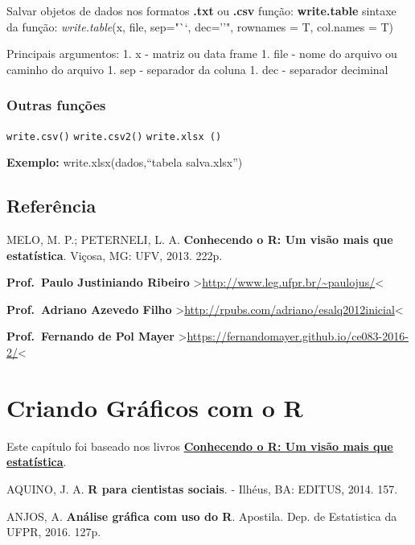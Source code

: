 \documentclass[
]{book}
\begin{document}
Salvar objetos de dados nos formatos \textbf{.txt} ou \textbf{.csv}
função: \textbf{write.table}
sintaxe da função:
\emph{write.table}(x, file, sep="``, dec=''", rownames = T, col.names = T)

Principais argumentos:
1. x - matriz ou data frame
1. file - nome do arquivo ou caminho do arquivo
1. sep - separador da coluna
1. dec - separador deciminal

\hypertarget{outras-funuxe7uxf5es}{%
\subsection{Outras funções}\label{outras-funuxe7uxf5es}}

\texttt{write.csv()}
\texttt{write.csv2()}
\texttt{write.xlsx\ ()}

\textbf{Exemplo:}
write.xlsx(dados,``tabela salva.xlsx'')

\hypertarget{referuxeancia-2}{%
\section{Referência}\label{referuxeancia-2}}

MELO, M. P.; PETERNELI, L. A. \textbf{Conhecendo o R: Um visão mais que estatística}. Viçosa, MG: UFV, 2013. 222p.

\textbf{Prof.~Paulo Justiniando Ribeiro} \textgreater{}\url{http://www.leg.ufpr.br/~paulojus/}\textless{}

\textbf{Prof.~Adriano Azevedo Filho} \textgreater{}\url{http://rpubs.com/adriano/esalq2012inicial}\textless{}

\textbf{Prof.~Fernando de Pol Mayer} \textgreater{}\url{https://fernandomayer.github.io/ce083-2016-2/}\textless{}

\hypertarget{criando-gruxe1ficos-com-o-r}{%
\chapter{Criando Gráficos com o R}\label{criando-gruxe1ficos-com-o-r}}

Este capítulo foi baseado nos livros \href{https://www.editoraufv.com.br/produto/conhecendo-o-r-uma-visao-mais-que-estatistica/1109294}{\textbf{Conhecendo o R: Um visão mais que estatística}}.

AQUINO, J. A. \textbf{R para cientistas sociais}. - Ilhéus, BA: EDITUS, 2014. 157.

ANJOS, A. \textbf{Análise gráfica com uso do R}. Apostila. Dep. de Estatistica da UFPR, 2016. 127p.
\end{document}
